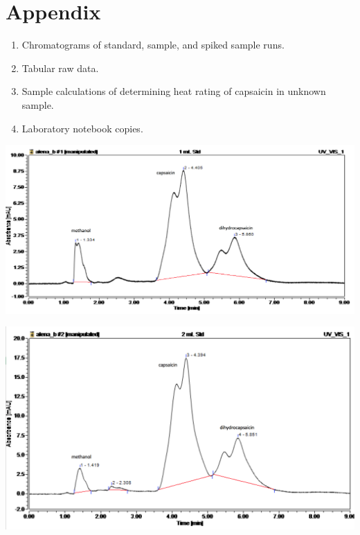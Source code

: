 \documentclass{article}
\begin{document}
\newpage
\section*{Appendix}
\begin{enumerate}
    \item Chromatograms of standard, sample, and spiked sample runs.
    \item Tabular raw data.
    \item Sample calculations of determining heat rating of capsaicin in
        unknown sample.
    \item Laboratory notebook copies.
\end{enumerate}

\newpage
\begin{center}

    \includegraphics[scale=0.25]{1mL}

\vspace{5cm}
    \includegraphics[scale=0.3]{2mL}


\end{center}
\end{document}
